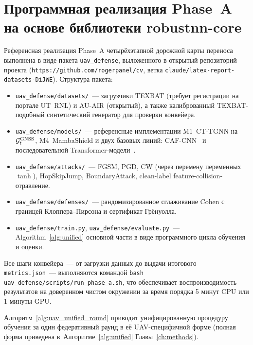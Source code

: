\section{Программная реализация Phase~A на основе библиотеки
\textsf{robustnn-core}}
\label{sec:uav_phase_a}

Референсная реализация Phase~A четырёхэтапной дорожной карты
переноса выполнена в виде пакета \texttt{uav\_defense}, выложенного в
открытый репозиторий проекта (\texttt{https://github.com/rogerpanel/cv},
ветка \texttt{claude/latex-report-datasets-DiJWE}). Структура пакета:

\begin{itemize}\setlength\itemsep{0.1em}
\item \texttt{uav\_defense/datasets/}~--- загрузчики TEXBAT (требует
регистрации на портале UT~RNL) и AU-AIR (открытый), а также калиброванный
TEXBAT-подобный синтетический генератор для проверки конвейера.
\item \texttt{uav\_defense/models/}~--- референсные имплементации
\textsf{M1~CT-TGNN} на $\mathcal{G}_t^{\text{GNSS}}$, \textsf{M4~MambaShield}
и двух базовых линий: CAF-CNN~\cite{borhani_2024_uav} и
последовательной Transformer-модели~\cite{aigner_2025_uav}.
\item \texttt{uav\_defense/attacks/}~--- FGSM, PGD, CW
(через перемену переменных $\tanh$), HopSkipJump, BoundaryAttack,
clean-label feature-collision-отравление.
\item \texttt{uav\_defense/defenses/}~--- рандомизированное сглаживание
Cohen с границей Клоппера--Пирсона и сертификат Грёнуолла.
\item \texttt{uav\_defense/train.py},
\texttt{uav\_defense/evaluate.py}~--- Algorithm~\ref{alg:unified}
основной части в виде программного цикла обучения и оценки.
\end{itemize}

Все шаги конвейера~--- от загрузки данных до выдачи итогового
\texttt{metrics.json}~--- выполняются командой
\texttt{bash uav\_defense/scripts/run\_phase\_a.sh}, что обеспечивает
воспроизводимость результатов на доверенном чистом окружении за время
порядка 5 минут CPU или 1 минуты GPU.

Алгоритм~\ref{alg:uav_unified_round} приводит унифицированную процедуру
обучения за один федеративный раунд в её UAV-специфичной форме (полная
форма приведена в~Алгоритме~\ref{alg:unified} Главы~\ref{ch:methods}).


